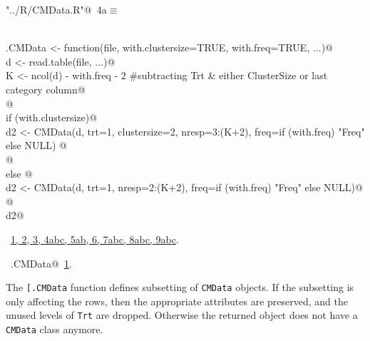 \documentclass[reqno]{amsart}
\renewcommand{\NWtarget}[2]{\hypertarget{#1}{#2}}
\renewcommand{\NWlink}[2]{\hyperlink{#1}{#2}}
\begin{document}
\begin{flushleft} \small
\begin{minipage}{\linewidth}\label{scrap4}\raggedright\small
\NWtarget{nuweb4a}{} \verb@"../R/CMData.R"@\nobreak\ {\footnotesize {4a}}$\equiv$
\vspace{-1ex}
\begin{list}{}{} \item
\mbox{}\verb@@\\
\mbox{}\verb@read.CMData <- function(file, with.clustersize=TRUE, with.freq=TRUE, ...){@\\
\mbox{}\verb@  d <- read.table(file, ...)@\\
\mbox{}\verb@  K <- ncol(d) - with.freq - 2  #subtracting Trt & either ClusterSize or last category column@\\
\mbox{}\verb@  @\\
\mbox{}\verb@  if (with.clustersize){@\\
\mbox{}\verb@    d2 <- CMData(d, trt=1, clustersize=2, nresp=3:(K+2), freq=if (with.freq) "Freq" else NULL) @\\
\mbox{}\verb@  }@\\
\mbox{}\verb@  else {@\\
\mbox{}\verb@    d2 <- CMData(d, trt=1, nresp=2:(K+2), freq=if (with.freq) "Freq" else NULL)@\\
\mbox{}\verb@  }@\\
\mbox{}\verb@  d2}@\\
\mbox{}\verb@@{\NWsep}
\end{list}
\vspace{-1.5ex}
\footnotesize
\begin{list}{}{\setlength{\itemsep}{-\parsep}\setlength{\itemindent}{-\leftmargin}}
\item \NWtxtFileDefBy\ \NWlink{nuweb1}{1}\NWlink{nuweb2}{, 2}\NWlink{nuweb3}{, 3}\NWlink{nuweb4a}{, 4a}\NWlink{nuweb4b}{b}\NWlink{nuweb4c}{c}\NWlink{nuweb5a}{, 5a}\NWlink{nuweb5b}{b}\NWlink{nuweb6}{, 6}\NWlink{nuweb7a}{, 7a}\NWlink{nuweb7b}{b}\NWlink{nuweb7c}{c}\NWlink{nuweb8a}{, 8a}\NWlink{nuweb8b}{b}\NWlink{nuweb8c}{c}\NWlink{nuweb9a}{, 9a}\NWlink{nuweb9b}{b}\NWlink{nuweb9c}{c}.
\item \NWtxtIdentsDefed\nobreak\  \verb@read.CMData@\nobreak\ \NWlink{nuweb1}{1}.
\item{}
\end{list}
\end{minipage}\vspace{4ex}
\end{flushleft}
The \texttt{[.CMData} function defines subsetting of \texttt{CMData} objects. If the subsetting is only affecting the rows, then
the appropriate attributes are preserved, and the unused levels of \texttt{Trt} are dropped. Otherwise the returned object does not
have a \texttt{CMData} class anymore.
\end{document}
